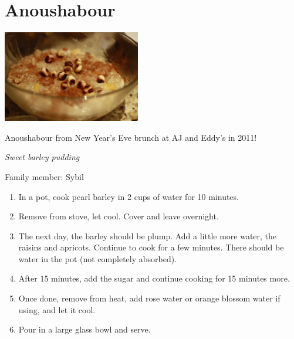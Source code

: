 \chapter{Anoushabour}
\label{ch:anoushabour}


\begin{marginfigure}[20pt]
  \includegraphics[width=60mm]{dermardiros/images/Anoushabour.JPG}
    \caption{Anoushabour from New Year's Eve brunch at AJ and Eddy's in 2011!}
\end{marginfigure}

\textit{Sweet barley pudding}

Family member: Sybil

\begin{enumerate}
    \item In a pot, cook pearl barley in 2 cups of water for 10 minutes.
    \item Remove from stove, let cool. Cover and leave overnight.
    \item The next day, the barley should be plump. Add a little more water, the raisins and apricots. Continue to cook for a few minutes. There should be water in the pot (not completely absorbed).
    \item After 15 minutes, add the sugar and continue cooking for 15 minutes more.
    \item Once done, remove from heat, add rose water or orange blossom water if using, and let it cool.
    \item Pour in a large glass bowl and serve.
\end{enumerate}
